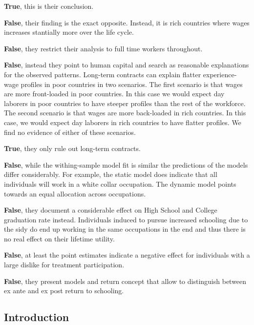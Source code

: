 \begin{boenumerate}
\item \textbf{True}, this is their conclusion.

\item \textbf{False}, their finding is the exact opposite. Instead, it is rich countries where wages increases stantially more over the life cycle.

\item \textbf{False}, they restrict their analysis to full time workers throughout.

\item \textbf{False}, instead they point to human capital and search as reasonable explanations for the observed patterns. Long-term contracts can explain flatter
experience-wage profiles in poor countries in two scenarios. The first scenario is that wages are more front-loaded in poor countries. In this case we would expect day laborers in poor countries to have steeper profiles than the rest of the workforce. The second scenario is that wages are more back-loaded in rich countries. In this case, we would expect day laborers in rich countries to have flatter profiles. We find no evidence of either of these scenarios.

\item \textbf{True}, they only rule out long-term contracts.

\item \textbf{False}, while the withing-sample model fit is similar the predictions of the models differ considerably. For example, the static model does indicate that all individuals will work in a white collar occupation. The dynamic model points towards an equal allocation across occupations.

\item \textbf{False}, they document a considerable effect on High School and College graduation rate instead. Individuals induced to pursue increased schooling due to the sidy do end up working in the same occupations in the end and thus there is no real effect on their lifetime utility.

\item \textbf{False}, at least the point estimates indicate a negative effect for individuals with a large dislike for treatment participation.

\item \textbf{False}, they present models and return concept that allow to distinguish between ex ante and ex post return to schooling.

\end{boenumerate}
\FloatBarrier\subsection{Introduction}

